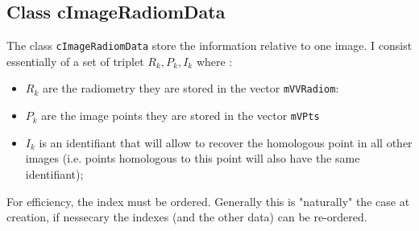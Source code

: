 \subsection{Class cImageRadiomData}

The class {\tt cImageRadiomData} store the information relative to one image.
I consist essentially of a set of triplet $R_k,P_k,I_k$ where :


\begin{itemize}
	\item $R_k$ are the radiometry they are stored in the vector {\tt mVVRadiom}:
	\item $P_k$ are the image points they are stored in the vector {\tt mVPts}
	\item $I_k$ is an identifiant that will allow to recover the homologous point
		in all  other images (i.e. points homologous to this point will also
		have the same identifiant);
\end{itemize}

For efficiency, the index must be ordered. Generally this is "naturally" the case at creation,
if nessecary the indexes (and the other data) can be re-ordered.








